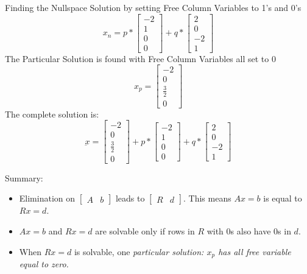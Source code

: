 \documentclass[10pt,a4paper]{article}
\begin{document}
		Finding the Nullspace Solution by setting Free Column Variables to 1's and 0's
		$$x_n = p*
		\begin{bmatrix}
			-2 \\ 
			1  \\ 
			0 \\
			0
		\end{bmatrix}+ q*\begin{bmatrix}
			2 \\ 
			0  \\ 
			-2 \\
			1
		\end{bmatrix}$$ 
		The Particular Solution is found with Free Column Variables all set to 0
		$$x_p = 
		\begin{bmatrix}
			-2 \\ 
			0  \\ 
			\frac{3}{2} \\
			0
		\end{bmatrix}$$ 
		The complete solution is: 
		$$\underbar{x} = 
		\begin{bmatrix}
			-2 \\ 
			0  \\ 
			\frac{3}{2} \\
			0
		\end{bmatrix} +
		p*
		\begin{bmatrix}
			-2 \\ 
			1  \\ 
			0 \\
			0
		\end{bmatrix}+ q*\begin{bmatrix}
			2 \\ 
			0  \\ 
			-2 \\
			1
		\end{bmatrix}$$ 

		\begin{tcolorbox}[breakable,colback=white,colframe=black,width=\dimexpr\textwidth+12mm\relax,enlarge left by=-6mm]
			Summary:
			\begin{itemize}
				\item Elimination on $\begin{bmatrix}
					A & b
					\end{bmatrix}$ leads to 
					$\begin{bmatrix}
						R & d
					\end{bmatrix}$. This means $Ax=b$ is equal to $Rx=d$.
				\item $Ax=b$ and $Rx=d$ are solvable only if rows in $R$ with 0s also have 0s in $d$.
				\item When $Rx=d$ is solvable, one \textit{particular solution: $x_p$ has all free variable
				equal to zero.}
			\end{itemize}
		\end{tcolorbox}

\end{document}

